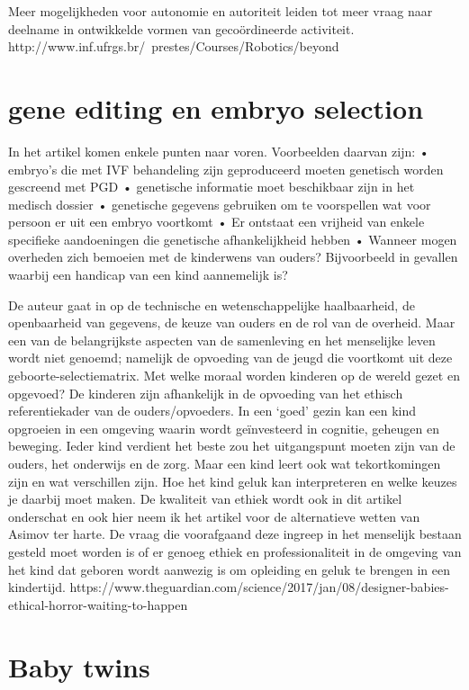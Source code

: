 \documentclass[11pt]{report}
\begin{document}
Meer mogelijkheden voor autonomie en autoriteit leiden tot meer vraag naar deelname in ontwikkelde vormen van gecoördineerde activiteit.
http://www.inf.ufrgs.br/~prestes/Courses/Robotics/beyond%

\section{gene editing en embryo selection}

In het artikel komen enkele punten naar voren.
Voorbeelden daarvan zijn:
• embryo’s die  met IVF behandeling zijn geproduceerd moeten genetisch worden gescreend met PGD
• genetische informatie moet beschikbaar zijn in het medisch dossier
• genetische gegevens gebruiken om te voorspellen wat voor persoon er uit een embryo voortkomt
• Er ontstaat een vrijheid van enkele specifieke aandoeningen die genetische afhankelijkheid hebben
• Wanneer mogen overheden zich bemoeien met de kinderwens van ouders? Bijvoorbeeld in gevallen waarbij een handicap van een kind aannemelijk is?

De auteur gaat in op de technische en wetenschappelijke haalbaarheid, de openbaarheid van gegevens, de keuze van ouders en de rol van de overheid. Maar een van de belangrijkste aspecten van de samenleving en het menselijke leven wordt niet genoemd; namelijk de opvoeding van de jeugd die voortkomt uit deze geboorte-selectiematrix.
Met welke moraal worden kinderen op de wereld gezet en opgevoed?
De kinderen zijn afhankelijk in de opvoeding van het ethisch referentiekader van de ouders/opvoeders. In een ‘goed’ gezin kan een kind opgroeien in een omgeving waarin wordt geïnvesteerd in cognitie, geheugen  en beweging. Ieder kind verdient het beste zou het uitgangspunt moeten zijn van de ouders, het onderwijs en de zorg. Maar een kind leert ook wat tekortkomingen zijn en wat verschillen zijn. Hoe het kind geluk kan interpreteren en welke keuzes je daarbij moet maken. De kwaliteit van ethiek wordt ook in dit artikel onderschat en ook hier neem ik het artikel voor de alternatieve wetten van Asimov ter harte. De vraag die voorafgaand deze ingreep in het menselijk bestaan gesteld moet worden is of er genoeg ethiek en professionaliteit in de omgeving van het kind dat geboren wordt aanwezig  is om opleiding en geluk te brengen in een kindertijd.
https://www.theguardian.com/science/2017/jan/08/designer-babies-ethical-horror-waiting-to-happen


\section{Baby twins}
\end{document}
